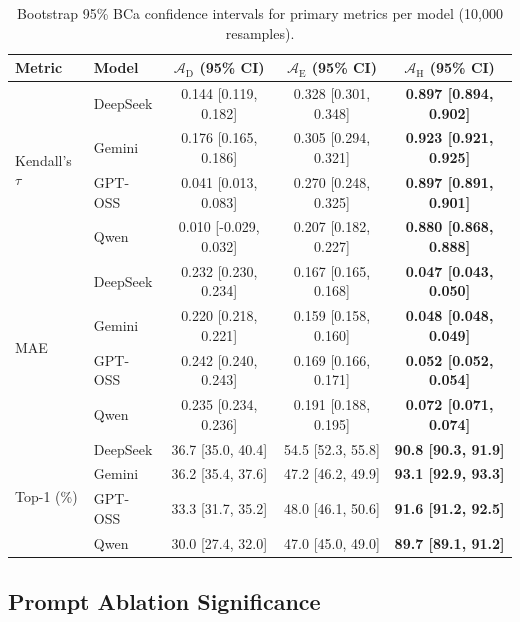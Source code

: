 \documentclass[final,3p,times]{elsarticle}
\begin{document}
\begin{table}[t]
\begin{threeparttable}
\small
\centering
\renewcommand{\arraystretch}{1.10}
\caption{Bootstrap 95\% BCa confidence intervals for primary metrics per model (10,000 resamples).}
\label{tab:bootstrap_ci}
\begin{tabular}{@{}l l c cc@{}}
\toprule
Metric & Model & $\mathcal{A}_{\text{D}}$ (95\% CI) & $\mathcal{A}_{\text{E}}$ (95\% CI) & $\mathcal{A}_{\text{H}}$ (95\% CI) \\
\midrule
\multirow{4}{*}{Kendall's $\tau$}
 & DeepSeek & 0.144 [0.119, 0.182] & 0.328 [0.301, 0.348] & \textbf{0.897 [0.894, 0.902]} \\
 & Gemini & 0.176 [0.165, 0.186] & 0.305 [0.294, 0.321] & \textbf{0.923 [0.921, 0.925]} \\
 & GPT-OSS & 0.041 [0.013, 0.083] & 0.270 [0.248, 0.325] & \textbf{0.897 [0.891, 0.901]} \\
 & Qwen & 0.010 [-0.029, 0.032] & 0.207 [0.182, 0.227] & \textbf{0.880 [0.868, 0.888]} \\
\midrule
\multirow{4}{*}{MAE}
 & DeepSeek & 0.232 [0.230, 0.234] & 0.167 [0.165, 0.168] & \textbf{0.047 [0.043, 0.050]} \\
 & Gemini & 0.220 [0.218, 0.221] & 0.159 [0.158, 0.160] & \textbf{0.048 [0.048, 0.049]} \\
 & GPT-OSS & 0.242 [0.240, 0.243] & 0.169 [0.166, 0.171] & \textbf{0.052 [0.052, 0.054]} \\
 & Qwen & 0.235 [0.234, 0.236] & 0.191 [0.188, 0.195] & \textbf{0.072 [0.071, 0.074]} \\
\midrule
\multirow{4}{*}{Top-1 (\%)}
 & DeepSeek & 36.7 [35.0, 40.4] & 54.5 [52.3, 55.8] & \textbf{90.8 [90.3, 91.9]} \\
 & Gemini & 36.2 [35.4, 37.6] & 47.2 [46.2, 49.9] & \textbf{93.1 [92.9, 93.3]} \\
 & GPT-OSS & 33.3 [31.7, 35.2] & 48.0 [46.1, 50.6] & \textbf{91.6 [91.2, 92.5]} \\
 & Qwen & 30.0 [27.4, 32.0] & 47.0 [45.0, 49.0] & \textbf{89.7 [89.1, 91.2]} \\
\bottomrule
\end{tabular}
\renewcommand{\arraystretch}{1.0}
\end{threeparttable}
\end{table}

\subsection{Prompt Ablation Significance}
\label{app:prompt-ablation-significance}
\end{document}

